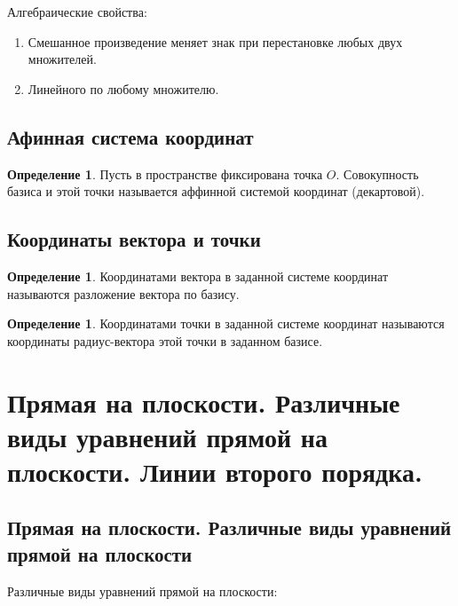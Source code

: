 \documentclass[12pt]{report}
\theoremstyle{definition}
\newtheorem{definition}[theorem]{Определение}
\begin{document}
Алгебраические свойства:
\begin{enumerate}
\item Смешанное произведение меняет знак при перестановке любых
  двух множителей.
\item Линейного по любому множителю.
\end{enumerate}

\subsection{Афинная система координат}
\begin{definition}
Пусть в пространстве фиксирована точка $O$. Совокупность базиса и 
этой точки называется аффинной системой координат (декартовой).
\end{definition}

\subsection{Координаты вектора и точки}

\begin{definition}
Координатами вектора в заданной системе координат называются
разложение вектора по базису. 
\end{definition}

\begin{definition}
Координатами точки в заданной системе координат
называются координаты радиус-вектора этой точки в
заданном базисе.
\end{definition}


\section
{
  Прямая на плоскости.
  Различные виды уравнений прямой на плоскости.
  Линии второго порядка.
}

\subsection{Прямая на плоскости. Различные виды уравнений прямой на плоскости}
Различные виды уравнений прямой на плоскости:
\end{document}
